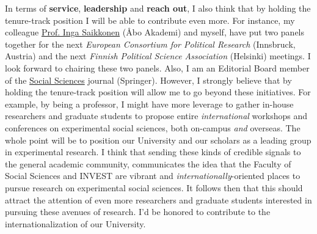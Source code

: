 \documentclass[10pt,stdletter,dateno,sigleft]{newlfm} %
\begin{document}
\begin{newlfm}
In terms of {\bf service}, {\bf leadership} and {\bf reach out}, I also think that by holding the tenure-track position I will be able to contribute even more. For instance, my colleague \href{https://research.abo.fi/en/persons/inga-saikkonen}{Prof. Inga Saikkonen} (\AA bo Akademi) and myself, have put two panels together for the next \emph{European Consortium for Political Research} (Innsbruck, Austria) and the next \emph{Finnish Political Science Association} (Helsinki) meetings. I look forward to chairing these two panels. Also, I am an Editorial Board member of the \href{https://www.springer.com/journal/43545}{Social Sciences} journal (Springer). However, I strongly believe that by holding the tenure-track position will allow me to go beyond these initiatives. For example, by being a professor, I might have more leverage to gather in-house researchers and graduate students to propose entire \emph{international} workshops and conferences on experimental social sciences, both on-campus \emph{and} overseas. The whole point will be to position our University and our scholars as a leading group in experimental research. I think that sending these kinds of credible signals to the general academic community, communicates the idea that the Faculty of Social Sciences and INVEST are vibrant and \emph{internationally}-oriented places to pursue research on experimental social sciences. It follows then that this should attract the attention of even more researchers and graduate students interested in pursuing these avenues of research. I'd be honored to contribute to the internationalization of our University.


\end{newlfm}
\end{document}
